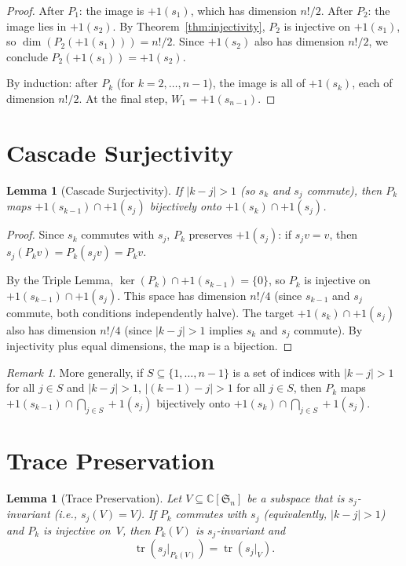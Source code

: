 \documentclass[11pt]{article}
\newtheorem{lemma}[theorem]{Lemma}
\theoremstyle{definition}
\theoremstyle{remark}
\newtheorem{remark}[theorem]{Remark}
\newcommand{\CC}{\mathbb{C}}
\newcommand{\Sym}{\mathfrak{S}}
\newcommand{\tr}{\operatorname{tr}}
\begin{document}
\begin{proof}
After $P_1$: the image is $+1(s_1)$, which has dimension $n!/2$.
After $P_2$: the image lies in $+1(s_2)$. By Theorem~\ref{thm:injectivity},
$P_2$ is injective on $+1(s_1)$, so $\dim(P_2(+1(s_1))) = n!/2$.
Since $+1(s_2)$ also has dimension $n!/2$, we conclude
$P_2(+1(s_1)) = +1(s_2)$.

By induction: after $P_k$ (for $k = 2, \dots, n-1$), the image is all
of $+1(s_k)$, each of dimension $n!/2$. At the final step,
$W_1 = +1(s_{n-1})$.
\end{proof}


\section{Cascade Surjectivity}

\begin{lemma}[Cascade Surjectivity]
\label{lem:cascade}
If $|k - j| > 1$ (so $s_k$ and $s_j$ commute), then $P_k$ maps
$+1(s_{k-1}) \cap +1(s_j)$ bijectively onto $+1(s_k) \cap +1(s_j)$.
\end{lemma}

\begin{proof}
Since $s_k$ commutes with $s_j$, $P_k$ preserves $+1(s_j)$: if
$s_j v = v$, then $s_j(P_k v) = P_k(s_j v) = P_k v$.

By the Triple Lemma, $\ker(P_k) \cap +1(s_{k-1}) = \{0\}$, so $P_k$ is
injective on $+1(s_{k-1}) \cap +1(s_j)$. This space has dimension $n!/4$
(since $s_{k-1}$ and $s_j$ commute, both conditions independently halve).
The target $+1(s_k) \cap +1(s_j)$ also has dimension $n!/4$
(since $|k-j| > 1$ implies $s_k$ and $s_j$ commute). By injectivity plus
equal dimensions, the map is a bijection.
\end{proof}

\begin{remark}
More generally, if $S \subseteq \{1, \dots, n-1\}$ is a set of indices
with $|k-j| > 1$ for all $j \in S$ and $|k-j| > 1$, $|(k-1) - j| > 1$
for all $j \in S$, then $P_k$ maps
$+1(s_{k-1}) \cap \bigcap_{j \in S} +1(s_j)$ bijectively onto
$+1(s_k) \cap \bigcap_{j \in S} +1(s_j)$.
\end{remark}


\section{Trace Preservation}

\begin{lemma}[Trace Preservation]
\label{lem:trace}
Let $V \subseteq \CC[\Sym_n]$ be a subspace that is $s_j$-invariant
(i.e., $s_j(V) = V$). If $P_k$ commutes with $s_j$ (equivalently,
$|k-j| > 1$) and $P_k$ is injective on~$V$, then $P_k(V)$ is
$s_j$-invariant and
\[
  \tr(s_j|_{P_k(V)}) = \tr(s_j|_V).
\]
\end{lemma}
\end{document}
